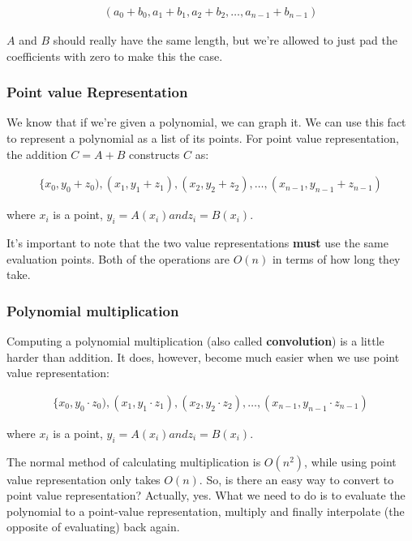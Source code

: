 \documentclass[11pt,a4paper,titlepage,dvipsnames,cmyk]{scrartcl}
\begin{document}
\begin{align*}
    (a_0 + b_0, a_1 + b_1, a_2 + b_2, \dots, a_{n-1} + b_{n-1})
\end{align*}

$A$ and $B$ should really have the same length, but we're allowed to just
pad the coefficients with zero to make this the case.

\subsubsection{Point value Representation}%
\label{ssub:point-value}
We know that if we're given a polynomial, we can graph it. We can use this
fact to represent a polynomial as a list of its points. For point value
representation, the addition $C = A + B$ constructs $C$ as:

\begin{align*}
    \{x_0, y_0 + z_0),(x_1,y_1 + z_1),(x_2,y_2 + z_2), \dots,
        (x_{n-1},y_{n-1} + z_{n-1})
\end{align*}

where $x_i$ is a point, $y_i = A(x_i) and z_i = B(x_i)$.

It's important to note that the two value representations \textbf{must}
use the same evaluation points. Both of the operations are $O(n)$ in
terms of how long they take.

\subsubsection{Polynomial multiplication}%
\label{ssub:convolution}
Computing a polynomial multiplication (also called \textbf{convolution})
is a little harder than addition. It does, however, become much easier
when we use point value representation:

\begin{align*}
    \{x_0, y_0 \cdot z_0),(x_1,y_1 \cdot z_1),(x_2,y_2 \cdot z_2), \dots,
        (x_{n-1},y_{n-1} \cdot z_{n-1})
\end{align*}

where $x_i$ is a point, $y_i = A(x_i) and z_i = B(x_i)$.

The normal method of calculating multiplication is $O(n^2)$, while using
point value representation only takes $O(n)$. So, is there an easy way to
convert to point value representation? Actually, yes. What we need to do
is to evaluate the polynomial to a point-value representation, multiply
and finally interpolate (the opposite of evaluating) back again.
\end{document}

